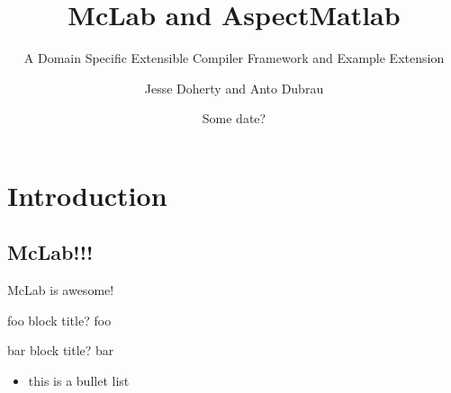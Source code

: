 \documentclass{beamer}
\begin{document}
\title{McLab and AspectMatlab}
\subtitle{\small{A Domain Specific Extensible Compiler Framework and
    Example Extension}}

\author{Jesse Doherty and Anto Dubrau} 
\date{Some date?} 


\small
{}

\frame{\titlepage} 


\section{Introduction}
\subsection{McLab!!!}
\begin{frame}
McLab is awesome!
\end{frame}
\begin{frame}
  \begin{block}{foo block title?}
    foo
  \end{block}
  \begin{block}{bar block title?}
    bar
  \end{block}
\end{frame}
\begin{frame}
  \begin{itemize}
  \item this is a bullet list
  \end{itemize}
\end{frame}
\end{document}
